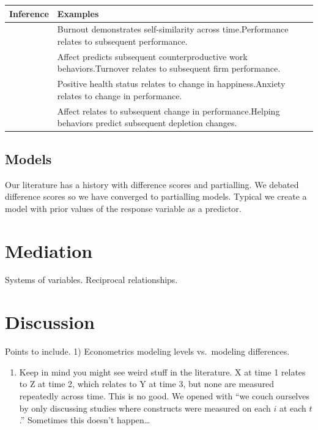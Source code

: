 \documentclass[english,,man]{apa6}
\providecommand{\tightlist}{%
  \setlength{\itemsep}{0pt}\setlength{\parskip}{0pt}}
\theoremstyle{definition}
\theoremstyle{definition}
\theoremstyle{definition}
\theoremstyle{remark}
\begin{document}
\begin{tabular}{>{\raggedright\arraybackslash}p{5em}>{\raggedright\arraybackslash}p{30em}}
\toprule
Inference & Examples\\
\midrule
1 & Burnout demonstrates self-similarity across time.\newline Performance relates to subsequent performance.\\
\hline
2 & Affect predicts subsequent counterproductive work behaviors.\newline Turnover relates to subsequent firm performance.\\
\hline
3 & Positive health status relates to change in happiness.\newline Anxiety relates to change in performance.\\
\hline
4 & Affect relates to subsequent change in performance.\newline Helping behaviors predict subsequent depletion changes.\\
\bottomrule
\end{tabular}

\hypertarget{models-2}{%
\subsection{Models}\label{models-2}}

Our literature has a history with difference scores and partialling. We
debated difference scores so we have converged to partialling models.
Typical we create a model with prior values of the response variable as
a predictor.

\hypertarget{mediation}{%
\section{Mediation}\label{mediation}}

Systems of variables. Reciprocal relationships.

\hypertarget{discussion}{%
\section{Discussion}\label{discussion}}

Points to include. 1) Econometrics modeling levels vs.~modeling
differences.

\begin{enumerate}
\def\labelenumi{\arabic{enumi})}
\setcounter{enumi}{1}
\tightlist
\item
  Keep in mind you might see weird stuff in the literature. X at time 1
  relates to Z at time 2, which relates to Y at time 3, but none are
  measured repeatedly across time. This is no good. We opened with
  \enquote{we couch ourselves by only discussing studies where
  constructs were measured on each \(i\) at each \(t\).} Sometimes this
  doesn't happen\ldots{}
\end{enumerate}
\end{document}
